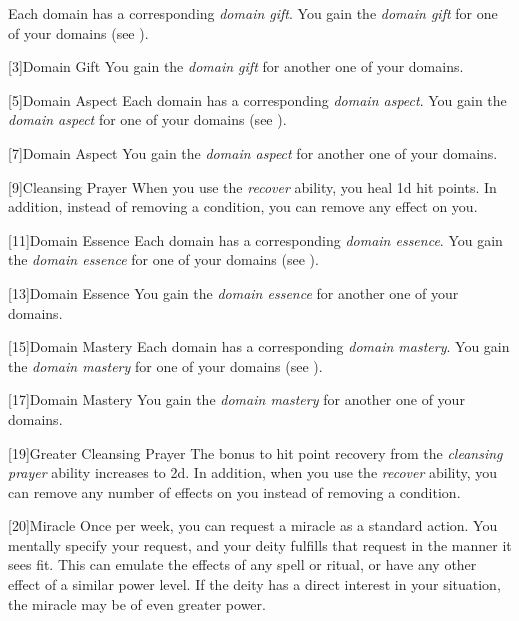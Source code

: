             Each domain has a corresponding \textit{domain gift}.
            You gain the \textit{domain gift} for one of your domains (see ).

            [3]{Domain Gift}
            You gain the \textit{domain gift} for another one of your domains.

            [5]{Domain Aspect}
            Each domain has a corresponding \textit{domain aspect}.
            You gain the \textit{domain aspect} for one of your domains (see ).

            [7]{Domain Aspect} 
            You gain the \textit{domain aspect} for another one of your domains.

            [9]{Cleansing Prayer}
            When you use the \textit{recover} ability, you heal \plus1d hit points.
            In addition, instead of removing a condition, you can remove any  effect on you.

            [11]{Domain Essence}
            Each domain has a corresponding \textit{domain essence}.
            You gain the \textit{domain essence} for one of your domains (see ).

            [13]{Domain Essence} 
            You gain the \textit{domain essence} for another one of your domains.

            [15]{Domain Mastery}
            Each domain has a corresponding \textit{domain mastery}.
            You gain the \textit{domain mastery} for one of your domains (see ).

            [17]{Domain Mastery} 
            You gain the \textit{domain mastery} for another one of your domains.

            [19]{Greater Cleansing Prayer} 
            The bonus to hit point recovery from the \textit{cleansing prayer} ability increases to \plus2d.
            In addition, when you use the \textit{recover} ability, you can remove any number of  effects on you instead of removing a condition.

            [20]{Miracle}
            Once per week, you can request a miracle as a standard action.
            You mentally specify your request, and your deity fulfills that request in the manner it sees fit.
            This can emulate the effects of any spell or ritual, or have any other effect of a similar power level.
            If the deity has a direct interest in your situation, the miracle may be of even greater power.

